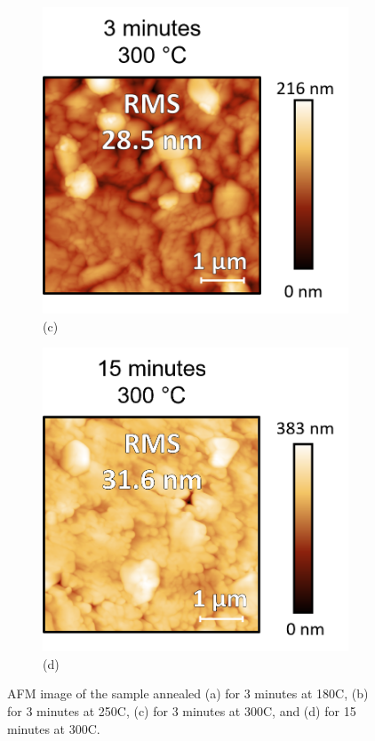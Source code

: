 \begin{figure}[htbp]
    \begin{subfigure}[t]{0.4\textwidth}
        \centering
        \includegraphics[width=\textwidth]{chapters/ellipsometry/image/300C_3min.png} %
        \caption*{(c)}
    \end{subfigure}
    \hfill
    \begin{subfigure}[t]{0.4\textwidth}
        \centering
        \includegraphics[width=\textwidth]{chapters/ellipsometry/image/300C_15min.png} %
        \caption*{(d)}
    \end{subfigure}
    \caption{AFM image of the  sample annealed (a) for 3 minutes at 180\degree C, (b) for 3 minutes at 250\degree C, (c) for 3 minutes at 300\degree C, and (d) for 15 minutes at 300\degree C.}
\end{figure}
